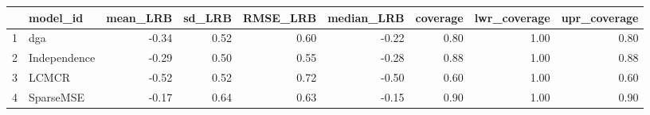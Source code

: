 \begin{table}[ht]
\centering
\begin{tabular}{rlrrrrrrr}
  \hline
 & model\_id & mean\_LRB & sd\_LRB & RMSE\_LRB & median\_LRB & coverage & lwr\_coverage & upr\_coverage \\ 
  \hline
1 & dga & -0.34 & 0.52 & 0.60 & -0.22 & 0.80 & 1.00 & 0.80 \\ 
  2 & Independence & -0.29 & 0.50 & 0.55 & -0.28 & 0.88 & 1.00 & 0.88 \\ 
  3 & LCMCR & -0.52 & 0.52 & 0.72 & -0.50 & 0.60 & 1.00 & 0.60 \\ 
  4 & SparseMSE & -0.17 & 0.64 & 0.63 & -0.15 & 0.90 & 1.00 & 0.90 \\ 
   \hline
\end{tabular}
\end{table}
